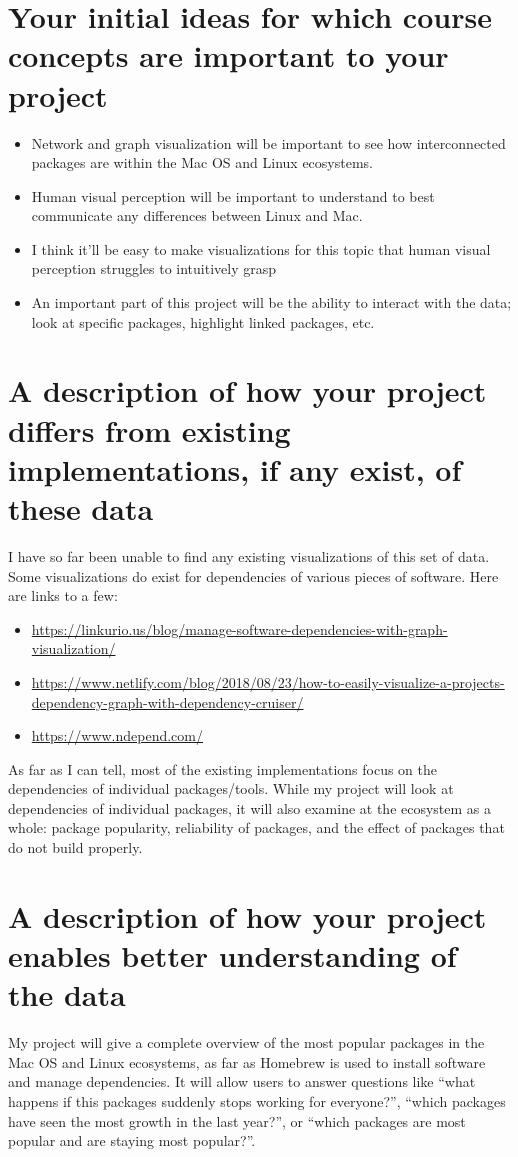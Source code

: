 \documentclass{article}
\begin{document}
\section{Your initial ideas for which course concepts are important to your project}
\begin{itemize}
    \item Network and graph visualization will be important to see how interconnected packages are within the Mac OS and Linux ecosystems. 
    \item Human visual perception will be important to understand to best communicate any differences between Linux and Mac.
    \item I think it'll be easy to make visualizations for this topic that human visual perception struggles to intuitively grasp
    \item An important part of this project will be the ability to interact with the data; look at specific packages, highlight linked packages, etc.
\end{itemize}

\section{A description of how your project differs from existing implementations, if any exist, of these data}

I have so far been unable to find any existing visualizations of this set of data. Some visualizations do exist for dependencies of various pieces of software. Here are links to a few:

\begin{itemize}
    \item \url{https://linkurio.us/blog/manage-software-dependencies-with-graph-visualization/}
    \item \url{https://www.netlify.com/blog/2018/08/23/how-to-easily-visualize-a-projects-dependency-graph-with-dependency-cruiser/}
    \item \url{https://www.ndepend.com/}
\end{itemize}

As far as I can tell, most of the existing implementations focus on the dependencies of individual packages/tools. While my project will look at dependencies of individual packages, it will also examine at the ecosystem as a whole: package popularity,  reliability of packages, and the effect of packages that do not build properly.

\section{A description of how your project enables better understanding of the data}
My project will give a complete overview of the most popular packages in the Mac OS and Linux ecosystems, as far as Homebrew is used to install software and manage dependencies. It will allow users to answer questions like ``what happens if this packages suddenly stops working for everyone?'', ``which packages have seen the most growth in the last year?'', or ``which packages are most popular and are staying most popular?''.
\end{document}

